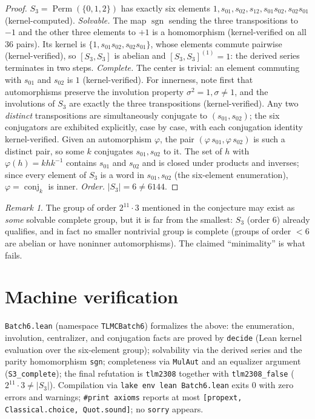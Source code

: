 \documentclass[11pt]{article}
\theoremstyle{definition}
\theoremstyle{remark}
\newtheorem*{remark}{Remark}
\begin{document}
\begin{proof}
$S_3 = \operatorname{Perm}(\{0,1,2\})$ has exactly six elements $1, s_{01}, s_{02}, s_{12}, s_{01}s_{02}, s_{02}s_{01}$ (kernel-computed).
\emph{Solvable.} The map $\operatorname{sgn}$ sending the three transpositions to $-1$ and the other three elements to $+1$ is a homomorphism (kernel-verified on all $36$ pairs). Its kernel is $\{1, s_{01}s_{02}, s_{02}s_{01}\}$, whose elements commute pairwise (kernel-verified), so $[S_3,S_3]$ is abelian and $[S_3,S_3]^{(1)} = 1$: the derived series terminates in two steps.
\emph{Complete.} The center is trivial: an element commuting with $s_{01}$ and $s_{02}$ is $1$ (kernel-verified). For innerness, note first that automorphisms preserve the involution property $\sigma^2 = 1, \sigma \ne 1$, and the involutions of $S_3$ are exactly the three transpositions (kernel-verified). Any two \emph{distinct} transpositions are simultaneously conjugate to $(s_{01}, s_{02})$; the six conjugators are exhibited explicitly, case by case, with each conjugation identity kernel-verified. Given an automorphism $\varphi$, the pair $(\varphi\, s_{01}, \varphi\, s_{02})$ is such a distinct pair, so some $k$ conjugates $s_{01}, s_{02}$ to it. The set of $h$ with $\varphi(h) = khk^{-1}$ contains $s_{01}$ and $s_{02}$ and is closed under products and inverses; since every element of $S_3$ is a word in $s_{01}, s_{02}$ (the six-element enumeration), $\varphi = \operatorname{conj}_k$ is inner.
\emph{Order.} $|S_3| = 6 \ne 6144$.
\end{proof}

\begin{remark}
The group of order $2^{11} \cdot 3$ mentioned in the conjecture may exist as \emph{some} solvable complete group, but it is far from the smallest: $S_3$ (order $6$) already qualifies, and in fact no smaller nontrivial group is complete (groups of order $< 6$ are abelian or have noninner automorphisms). The claimed ``minimality'' is what fails.
\end{remark}

\section{Machine verification}

\texttt{Batch6.lean} (namespace \texttt{TLMCBatch6}) formalizes the above: the enumeration, involution, centralizer, and conjugation facts are proved by \texttt{decide} (Lean kernel evaluation over the six-element group); solvability via the derived series and the parity homomorphism \texttt{sgn}; completeness via \texttt{MulAut} and an equalizer argument (\texttt{S3\_complete}); the final refutation is \texttt{tlm2308} together with \texttt{tlm2308\_false} ($2^{11} \cdot 3 \ne |S_3|$). Compilation via \texttt{lake env lean Batch6.lean} exits $0$ with zero errors and warnings; \texttt{\#print axioms} reports at most \texttt{[propext, Classical.choice, Quot.sound]}; no \texttt{sorry} appears.
\end{document}

